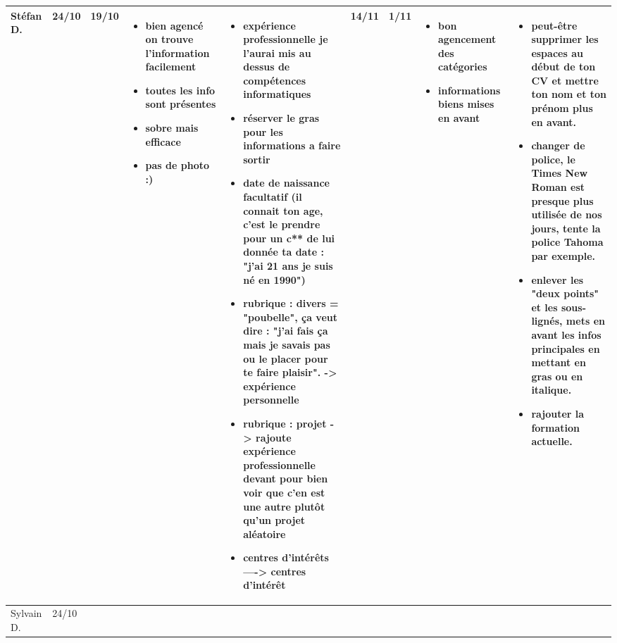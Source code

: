 \documentclass[a4paper,11pt]{article}
\begin{document}
\begin{landscape}
\begin{longtable}{|l|l|l|p{4cm}|p{4cm}|l|l|p{4cm}|p{4cm}|}
    Stéfan D. & 24/10 & 19/10
	      & \begin{itemize}
		\item bien agencé on trouve l'information facilement
		\item toutes les info sont présentes
		\item sobre mais efficace
		\item pas de photo :)
		\end{itemize}
	      & \begin{itemize}
		\item expérience professionnelle je l'aurai mis au dessus de compétences informatiques
		\item réserver le gras pour les informations a faire sortir
		\item date de naissance facultatif (il connait ton age, c'est le prendre pour un c** de lui donnée ta date : "j'ai 21 ans je suis né en 1990")
		\item rubrique : divers = "poubelle", ça veut dire : "j'ai fais ça mais je savais pas ou le placer pour te faire plaisir". -> expérience personnelle
		\item rubrique : projet -> rajoute expérience professionnelle devant pour bien voir que c'en est une autre plutôt qu'un projet aléatoire
		\item centres d’intérêts ----> centres d’intérêt
		\end{itemize}
	      & 14/11 & 1/11
	      & \begin{itemize}
		\item bon agencement des catégories
		\item informations biens mises en avant
		\end{itemize}
	      & \begin{itemize}
		\item peut-être supprimer les espaces au début de ton CV et mettre ton nom et ton prénom plus en avant.
		\item changer de police, le Times New Roman est presque plus utilisée de nos jours, tente la police Tahoma par exemple.
		\item enlever les "deux points" et les sous-lignés, mets en avant les infos principales en mettant en gras ou en italique.
		\item rajouter la formation actuelle.
		\end{itemize} \\ \hline

    Sylvain D. & 24/10 & & & & & & & \\ \hline
  \end{longtable}
\end{landscape}
\end{document}
